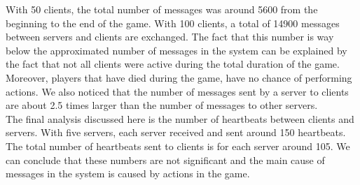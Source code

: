 		With 50 clients, the total number of messages was around 5600 from the beginning to the end of the game. 
		With 100 clients, a total of 14900 messages between servers and clients are exchanged. 
		The fact that this number is way below the approximated number of messages in the system can be explained by the fact that not all clients were active during the total duration of the game. 
		Moreover, players that have died during the game, have no chance of performing actions. We also noticed that the number of messages sent by a server to clients are about 2.5 times larger than the number of messages to other servers.\\
		The final analysis discussed here is the number of heartbeats between clients and servers. 
		With five servers, each server received and sent around 150 heartbeats. 
		The total number of heartbeats sent to clients is for each server around 105. 
		We can conclude that these numbers are not significant and the main cause of messages in the system is caused by actions in the game.
